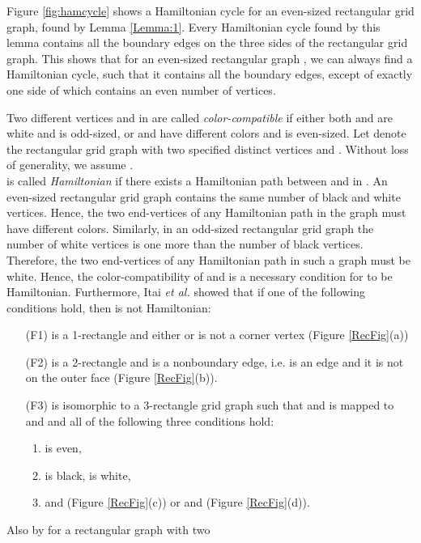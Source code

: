 \documentclass[preprint,12pt]{elsarticle}
\begin{document}
\par Figure \ref{fig:hamcycle} shows a
Hamiltonian cycle for an even-sized rectangular grid graph, found by
Lemma \ref{Lemma:1}. Every Hamiltonian cycle found by this lemma
contains all the boundary edges on the three sides of the
rectangular grid graph. This shows that for an even-sized
rectangular graph , we can always find a Hamiltonian cycle, such
that it contains all the boundary edges, except of exactly one side of  which contains an even number of vertices.\par
Two different vertices  and  in  are
called \textit{color-compatible} if either both  and
 are white and  is odd-sized, or  and
 have different colors and  is even-sized. Let
 denote the rectangular grid graph  with two
specified distinct vertices  and . Without loss of generality,
we assume .\\  is called
\textit{Hamiltonian} if there exists a Hamiltonian path between 
and  in . An even-sized rectangular grid graph contains
the same number of black and white vertices. Hence, the two
end-vertices of any Hamiltonian path in the graph must have
different colors. Similarly, in an odd-sized rectangular grid graph
the number of white vertices is one more than the number of black
vertices. Therefore, the two end-vertices of any Hamiltonian path in
such a graph must be white. Hence, the color-compatibility of 
and  is a necessary condition for  to be
Hamiltonian. Furthermore, Itai \textit{et al.} \cite{IPS:HPIGG}
showed that if one of the following conditions hold, then
 is not Hamiltonian:
\begin{itemize}
\item [(F1)]  is a 1-rectangle and either  or  is not a corner
vertex (Figure \ref{RecFig}(a))
\item[(F2)]  is a 2-rectangle
and  is a nonboundary edge, i.e.  is an edge and it is
not on the outer face (Figure \ref{RecFig}(b)).
\item [(F3)]  is
isomorphic to a 3-rectangle grid graph  such that  and
 is mapped to  and  and all of the following three conditions hold:
\begin{enumerate}
\item  is even,
\item  is black,  is white,
\item   and  (Figure \ref{RecFig}(c)) or
 and  (Figure \ref{RecFig}(d)).
\end{enumerate}
\end{itemize}
Also by \cite{IPS:HPIGG} for a rectangular graph  with two
\end{document}
